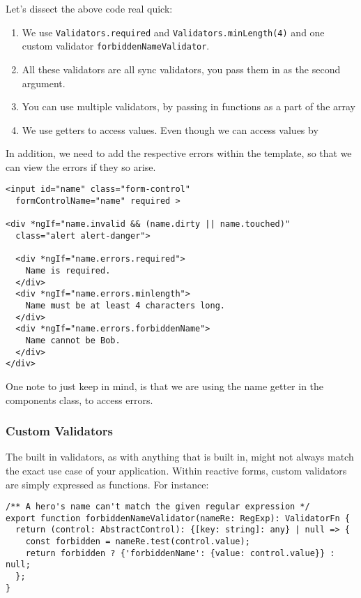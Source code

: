 Let's dissect the above code real quick: 

\begin{enumerate}
  \item We use \lstinline{Validators.required} and \lstinline{Validators.minLength(4)}
  and one custom validator \lstinline{forbiddenNameValidator}.
  \item All these validators are all sync validators, you pass them in as the 
  second argument.
  \item You can use multiple validators, by passing in functions as a part of 
  the array
  \item We use getters to access values. Even though we can access values by
  
\end{enumerate}

In addition, we need to add the respective errors within the template, so that
we can view the errors if they so arise. 

\begin{lstlisting}
<input id="name" class="form-control"
  formControlName="name" required >

<div *ngIf="name.invalid && (name.dirty || name.touched)"
  class="alert alert-danger">

  <div *ngIf="name.errors.required">
    Name is required.
  </div>
  <div *ngIf="name.errors.minlength">
    Name must be at least 4 characters long.
  </div>
  <div *ngIf="name.errors.forbiddenName">
    Name cannot be Bob.
  </div>
</div>
\end{lstlisting}

One note to just keep in mind, is that we are using the name getter in the 
components class, to access errors. 

\subsubsection{Custom Validators}
The built in validators, as with anything that is built in, might not always
match the exact use case of your application. Within reactive forms, custom
validators are simply expressed as functions. For instance: 

\begin{lstlisting}
/** A hero's name can't match the given regular expression */
export function forbiddenNameValidator(nameRe: RegExp): ValidatorFn {
  return (control: AbstractControl): {[key: string]: any} | null => {
    const forbidden = nameRe.test(control.value);
    return forbidden ? {'forbiddenName': {value: control.value}} : null;
  };
}
\end{lstlisting}

